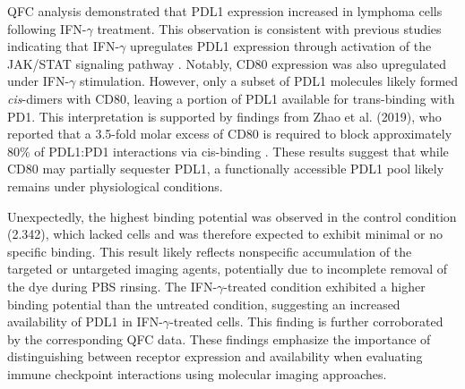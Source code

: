 QFC analysis demonstrated that PDL1 expression increased in lymphoma cells following IFN-$\gamma$ treatment. This observation is consistent with previous studies indicating that IFN-$\gamma$ upregulates PDL1 expression through activation of the JAK/STAT signaling pathway \cite{garciadiaz2017interferon, mitsuiki2019ctla}. Notably, CD80 expression was also upregulated under IFN-$\gamma$ stimulation. However, only a subset of PDL1 molecules likely formed \textit{cis}-dimers with CD80, leaving a portion of PDL1 available for trans-binding with PD1. This interpretation is supported by findings from Zhao et al. (2019), who reported that a 3.5-fold molar excess of CD80 is required to block approximately $80\%$ of PDL1:PD1 interactions via cis-binding \cite{zhao2019pdl1cd80}. These results suggest that while CD80 may partially sequester PDL1, a functionally accessible PDL1 pool likely remains under physiological conditions.
    
Unexpectedly, the highest binding potential was observed in the control condition (2.342), which lacked cells and was therefore expected to exhibit minimal or no specific binding. This result likely reflects nonspecific accumulation of the targeted or untargeted imaging agents, potentially due to incomplete removal of the dye during PBS rinsing. The IFN-$\gamma$-treated condition exhibited a higher binding potential than the untreated condition, suggesting an increased availability of PDL1 in IFN-$\gamma$-treated cells. This finding is further corroborated by the corresponding QFC data. These findings emphasize the importance of distinguishing between receptor expression and availability when evaluating immune checkpoint interactions using molecular imaging approaches.

